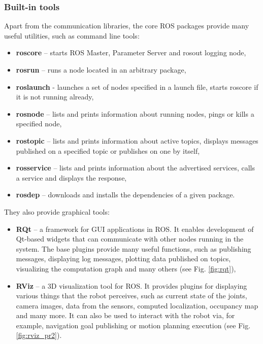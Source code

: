 \documentclass[english,inz,shortabstract]{iithesis}
\begin{document}
\pagebreak

		\subsubsection{Built-in tools}
		Apart from the communication libraries, the core ROS packages provide many useful utilities, such as command line tools:

		\begin{itemize}[itemsep=0pt, parsep=2pt, topsep=0pt]
			\item \textbf{roscore} -- starts ROS Master, Parameter Server and \textsf{rosout} \cite{ros:rosout} logging node,
			\item \textbf{rosrun} -- runs a node located in an arbitrary package,
			\item \textbf{roslaunch} - launches a set of nodes specified in a launch file, starts roscore if it is not running already,
			\item \textbf{rosnode} -- lists and prints information about running nodes, pings or kills a specified node,
			\item \textbf{rostopic} -- lists and prints information about active topics, displays messages published on a specified topic or publishes on one by itself,
			\item \textbf{rosservice} -- lists and prints information about the advertised services, calls a service and displays the response,
			\item \textbf{rosdep} -- downloads and installs the dependencies of a given package.
		\end{itemize}
		They also provide graphical tools:

		\begin{itemize}[itemsep=0pt, parsep=2pt, topsep=0pt]
			\item \textbf{RQt} -- a framework for GUI applications in ROS. It enables development of Qt-based widgets that can communicate with other nodes running in the system. The base plugins provide many useful functions, such as publishing messages, displaying log messages, plotting data published on topics, visualizing the computation graph and many others (see Fig. \ref{fig:rqt}),
			\item \textbf{RViz} -- a 3D visualization tool for ROS. It provides plugins for displaying various things that the robot perceives, such as current state of the joints, camera images, data from the sensors, computed localization, occupancy map and many more. It can also be used to interact with the robot via, for example, navigation goal publishing or motion planning execution (see Fig. \ref{fig:rviz_pr2}).
		\end{itemize}
\end{document}
